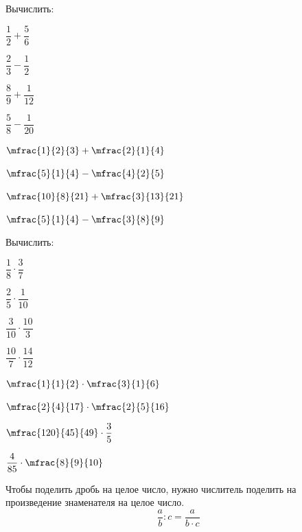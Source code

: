 %
%
%
%
%
%
\begin{class}[number=2]
	\begin{listofex}
		\item Вычислить:
			\begin{enumcols}[itemcolumns=4]
				\item \( \dfrac{1}{2}+\dfrac{5}{6} \)
				\item \( \dfrac{2}{3}-\dfrac{1}{2} \)
				\item \( \dfrac{8}{9}+\dfrac{1}{12} \)
				\item \( \dfrac{5}{8}-\dfrac{1}{20} \)
				\item \( \mfrac{1}{2}{3}+\mfrac{2}{1}{4} \)
				\item \( \mfrac{5}{1}{4}-\mfrac{4}{2}{5} \)
				\item \( \mfrac{10}{8}{21}+\mfrac{3}{13}{21} \)
				\item \( \mfrac{5}{1}{4}-\mfrac{3}{8}{9} \)
			\end{enumcols}
		\item Вычислить:
		\begin{enumcols}[itemcolumns=4]
			\item \( \dfrac{1}{8}\cdot\dfrac{3}{7} \)
			\item \( \dfrac{2}{5}\cdot\dfrac{1}{10} \)
			\item \( \dfrac{3}{10}\cdot\dfrac{10}{3} \)
			\item \( \dfrac{10}{7}\cdot\dfrac{14}{12} \)
			\item \( \mfrac{1}{1}{2}\cdot\mfrac{3}{1}{6} \)
			\item \( \mfrac{2}{4}{17}\cdot\mfrac{2}{5}{16} \)
			\item \( \mfrac{120}{45}{49}\cdot\dfrac{3}{5} \)
			\item \( \dfrac{4}{85}\cdot\mfrac{8}{9}{10} \)
			\end{enumcols}
		\end{listofex}
		\begin{definit}
			Чтобы поделить дробь на целое число, нужно числитель поделить на произведение знаменателя на целое число.
			\[ \dfrac{a}{b}:c=\dfrac{a}{b\cdot c} \]

\end{definit}
\end{class}
